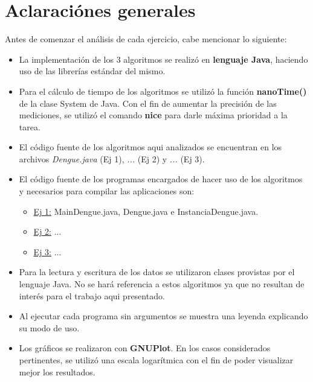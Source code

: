 \documentclass[a4paper,11pt] {article}
\begin{document}
\grupo{}

\maketitle

\bigskip
\section*{Aclaraci\'ones generales}

Antes de comenzar el an\'alisis de cada ejercicio, cabe mencionar lo siguiente:

\begin{itemize}
 \item La implementaci\'on de los 3 algoritmos se realizó en \textbf{lenguaje Java}, haciendo uso de las librer\'ias est\'andar del mismo.
 \item Para el c\'alculo de tiempo de los algoritmos se utiliz\'o la funci\'on \textbf{nanoTime()} de la clase System de Java. Con el fin de aumentar la precisión de las mediciones, se utilizó el comando \textbf{nice} para darle máxima prioridad a la tarea.
 \item El c\'odigo fuente de los algoritmos aqui analizados se encuentran en los archivos \textit{Dengue.java} (Ej 1), \textit{...} (Ej 2) y \textit{...} (Ej 3).
 \item El c\'odigo fuente de los programas encargados de hacer uso de los algoritmos y necesarios para compilar las aplicaciones son:
 \begin{itemize}
    \item \underline{Ej 1:} MainDengue.java, Dengue.java e InstanciaDengue.java.
    \item \underline{Ej 2:} ...
    \item \underline{Ej 3:} ...
  \end{itemize}
 \item Para la lectura y escritura de los datos se utilizaron clases provistas por el lenguaje Java. No se har\'a referencia a estos algoritmos ya que no resultan de inter\'es para el trabajo aqui presentado.
 \item Al ejecutar cada programa sin argumentos se muestra una leyenda explicando su modo de uso.
 \item Los gr\'aficos se realizaron con \textbf{GNUPlot}. En los casos considerados pertinentes, se utiliz\'o una escala logar\'itmica con el fin de poder visualizar mejor los resultados.
\end{itemize}
\end{document}
